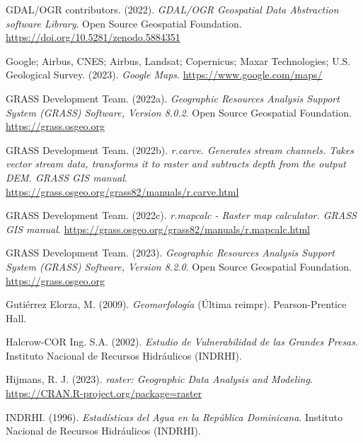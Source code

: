 \documentclass[spanish]{article}
\newlength{\cslhangindent}
\newlength{\cslentryspacingunit} %
\newenvironment{CSLReferences}[2] %
 {%
  \setlength{\parindent}{0pt}
  \ifodd #1
  \let\oldpar\par
  \def\par{\hangindent=\cslhangindent\oldpar}
  \fi
  \setlength{\parskip}{#2\cslentryspacingunit}
 }%
 {}
\begin{document}
\begin{CSLReferences}{1}{0}
\leavevmode{}%
GDAL/OGR contributors. (2022). \emph{{GDAL/OGR} Geospatial Data
Abstraction software Library}. Open Source Geospatial Foundation.
\url{https://doi.org/10.5281/zenodo.5884351}

\leavevmode{}%
Google; Airbus, CNES; Airbus, Landsat; Copernicus; Maxar Technologies;
U.S. Geological Survey. (2023). \emph{Google Maps}.
\url{https://www.google.com/maps/}

\leavevmode{}%
GRASS Development Team. (2022a). \emph{Geographic Resources Analysis
Support System (GRASS) Software, Version 8.0.2}. Open Source Geospatial
Foundation. \url{https://grass.osgeo.org}

\leavevmode{}%
GRASS Development Team. (2022b). \emph{r.carve. Generates stream
channels. Takes vector stream data, transforms it to raster and
subtracts depth from the output DEM. GRASS GIS manual}.
\url{https://grass.osgeo.org/grass82/manuals/r.carve.html}

\leavevmode{}%
GRASS Development Team. (2022c). \emph{r.mapcalc - Raster map
calculator. GRASS GIS manual}.
\url{https://grass.osgeo.org/grass82/manuals/r.mapcalc.html}

\leavevmode{}%
GRASS Development Team. (2023). \emph{Geographic Resources Analysis
Support System (GRASS) Software, Version 8.2.0}. Open Source Geospatial
Foundation. \url{https://grass.osgeo.org}

\leavevmode{}%
Gutiérrez Elorza, M. (2009). \emph{Geomorfología} (Última reimpr).
Pearson-Prentice Hall.

\leavevmode{}%
Halcrow-COR Ing. S.A. (2002). \emph{{Estudio de Vulnerabilidad de las
Grandes Presas}}. {Instituto Nacional de Recursos Hidráulicos (INDRHI)}.

\leavevmode{}%
Hijmans, R. J. (2023). \emph{raster: Geographic Data Analysis and
Modeling}. \url{https://CRAN.R-project.org/package=raster}

\leavevmode{}%
INDRHI. (1996). \emph{{Estadísticas del Agua en la República
Dominicana}}. {Instituto Nacional de Recursos Hidráulicos (INDRHI)}.


\end{CSLReferences}
\end{document}
